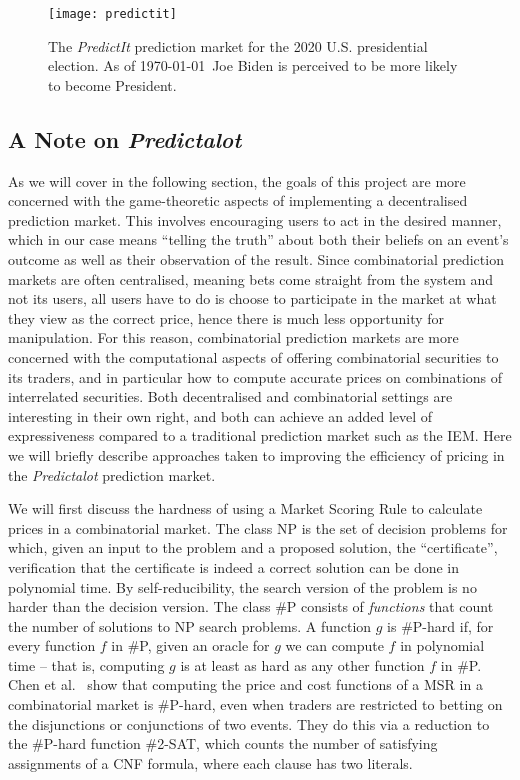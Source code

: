 \begin{figure}[h]
	\centering
	\texttt{[image: predictit]}
	\caption{The \emph{PredictIt} prediction market for the 2020 U.S.
	presidential election. As of \today\ Joe Biden is perceived to be more
	likely to become President.}
	\label{fig:predictit}
\end{figure}

\subsection{A Note on \emph{Predictalot}}

As we will cover in the following section, the goals of this project are more
concerned with the game-theoretic aspects of implementing a decentralised
prediction market. This involves encouraging users to act in the desired
manner, which in our case means ``telling the truth'' about both their beliefs
on an event's outcome as well as their observation of the result. Since
combinatorial prediction markets are often centralised, meaning bets come
straight from the system and not its users, all users have to do is choose to
participate in the market at what they view as the correct price, hence there
is much less opportunity for manipulation. For this reason, combinatorial
prediction markets are more concerned with the computational aspects of
offering combinatorial securities to its traders, and in particular how to
compute accurate prices on combinations of interrelated securities. Both
decentralised and combinatorial settings are interesting in their own right,
and both can achieve an added level of expressiveness compared to a traditional
prediction market such as the IEM. Here we will briefly describe approaches
taken to improving the efficiency of pricing in the \emph{Predictalot}
prediction market.

We will first discuss the hardness of using a Market Scoring Rule to calculate
prices in a combinatorial market. The class NP is the set of decision problems
for which, given an input to the problem and a proposed solution, the
``certificate'', verification that the certificate is indeed a correct solution
can be done in polynomial time. By self-reducibility, the search version of the
problem is no harder than the decision version. The class \#P consists of
\emph{functions} that count the number of solutions to NP search problems. A
function $g$ is \#P-hard if, for every function $f$ in \#P, given an oracle for
$g$ we can compute $f$ in polynomial time -- that is, computing $g$ is at least
as hard as any other function $f$ in \#P. Chen et al.~\cite{Chen2008} show that
computing the price and cost functions of a MSR in a combinatorial market is
\#P-hard, even when traders are restricted to betting on the disjunctions or
conjunctions of two events. They do this via a reduction to the \#P-hard
function \textsc{\#2-SAT}, which counts the number of satisfying assignments of
a CNF formula, where each clause has two literals. 

